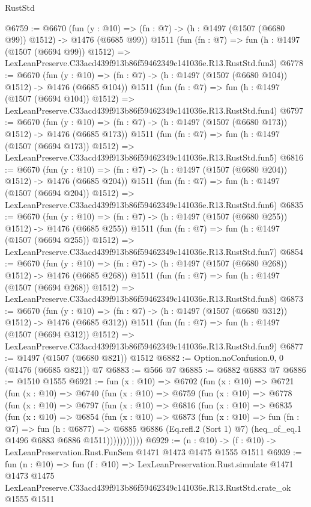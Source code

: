 \begin{lexlean}{RustStd}
\begin{coremodule}
@6759 := @6670
    (fun (y : @10) => (fn : @7) -> (h : @1497 (@1507 (@6680 @99)) @1512) -> @1476 (@6685 @99))
    @1511
    (fun (fn : @7) =>
    fun (h : @1497 (@1507 (@6694 @99)) @1512) =>
    LexLeanPreserve.C33acd439f913b86f59462349c141036e.R13.RustStd.fun3)
@6778 := @6670
    (fun (y : @10) => (fn : @7) -> (h : @1497 (@1507 (@6680 @104)) @1512) -> @1476 (@6685 @104))
    @1511
    (fun (fn : @7) =>
    fun (h : @1497 (@1507 (@6694 @104)) @1512) =>
    LexLeanPreserve.C33acd439f913b86f59462349c141036e.R13.RustStd.fun4)
@6797 := @6670
    (fun (y : @10) => (fn : @7) -> (h : @1497 (@1507 (@6680 @173)) @1512) -> @1476 (@6685 @173))
    @1511
    (fun (fn : @7) =>
    fun (h : @1497 (@1507 (@6694 @173)) @1512) =>
    LexLeanPreserve.C33acd439f913b86f59462349c141036e.R13.RustStd.fun5)
@6816 := @6670
    (fun (y : @10) => (fn : @7) -> (h : @1497 (@1507 (@6680 @204)) @1512) -> @1476 (@6685 @204))
    @1511
    (fun (fn : @7) =>
    fun (h : @1497 (@1507 (@6694 @204)) @1512) =>
    LexLeanPreserve.C33acd439f913b86f59462349c141036e.R13.RustStd.fun6)
@6835 := @6670
    (fun (y : @10) => (fn : @7) -> (h : @1497 (@1507 (@6680 @255)) @1512) -> @1476 (@6685 @255))
    @1511
    (fun (fn : @7) =>
    fun (h : @1497 (@1507 (@6694 @255)) @1512) =>
    LexLeanPreserve.C33acd439f913b86f59462349c141036e.R13.RustStd.fun7)
@6854 := @6670
    (fun (y : @10) => (fn : @7) -> (h : @1497 (@1507 (@6680 @268)) @1512) -> @1476 (@6685 @268))
    @1511
    (fun (fn : @7) =>
    fun (h : @1497 (@1507 (@6694 @268)) @1512) =>
    LexLeanPreserve.C33acd439f913b86f59462349c141036e.R13.RustStd.fun8)
@6873 := @6670
    (fun (y : @10) => (fn : @7) -> (h : @1497 (@1507 (@6680 @312)) @1512) -> @1476 (@6685 @312))
    @1511
    (fun (fn : @7) =>
    fun (h : @1497 (@1507 (@6694 @312)) @1512) =>
    LexLeanPreserve.C33acd439f913b86f59462349c141036e.R13.RustStd.fun9)
@6877 := @1497 (@1507 (@6680 @821)) @1512
@6882 := Option.noConfusion.{0, 0} (@1476 (@6685 @821)) @7
@6883 := @566 @7
@6885 := @6882 @6883 @7
@6886 := @1510 @1555
@6921 := fun (x : @10) =>
  @6702
    (fun (x : @10) =>
    @6721
      (fun (x : @10) =>
      @6740
        (fun (x : @10) =>
        @6759
          (fun (x : @10) =>
          @6778
            (fun (x : @10) =>
            @6797
              (fun (x : @10) =>
              @6816
                (fun (x : @10) =>
                @6835
                  (fun (x : @10) =>
                  @6854
                    (fun (x : @10) =>
                    @6873
                      (fun (x : @10) =>
                      fun (fn : @7) =>
                      fun (h : @6877) =>
                      @6885
                        @6886
                        (Eq.refl.{2} (Sort 1) @7)
                        (heq_of_eq.{1} @1496 @6883 @6886 @1511)))))))))))
@6929 := (n : @10) -> (f : @10) -> LexLeanPreservation.Rust.FunSem @1471 @1473 @1475 @1555 @1511
@6939 := fun (n : @10) =>
  fun (f : @10) =>
  LexLeanPreservation.Rust.simulate
    @1471
    @1473
    @1475
    LexLeanPreserve.C33acd439f913b86f59462349c141036e.R13.RustStd.crate_ok
    @1555
    @1511
\end{coremodule}
\end{lexlean}
